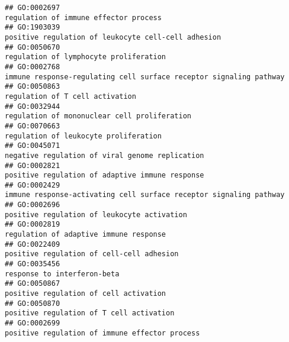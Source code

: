 \documentclass[
]{article}
\begin{document}
\begin{verbatim}
## GO:0002697                                                                                                            regulation of immune effector process
## GO:1903039                                                                                              positive regulation of leukocyte cell-cell adhesion
## GO:0050670                                                                                                           regulation of lymphocyte proliferation
## GO:0002768                                                                               immune response-regulating cell surface receptor signaling pathway
## GO:0050863                                                                                                                  regulation of T cell activation
## GO:0032944                                                                                                     regulation of mononuclear cell proliferation
## GO:0070663                                                                                                            regulation of leukocyte proliferation
## GO:0045071                                                                                                  negative regulation of viral genome replication
## GO:0002821                                                                                                  positive regulation of adaptive immune response
## GO:0002429                                                                               immune response-activating cell surface receptor signaling pathway
## GO:0002696                                                                                                      positive regulation of leukocyte activation
## GO:0002819                                                                                                           regulation of adaptive immune response
## GO:0022409                                                                                                        positive regulation of cell-cell adhesion
## GO:0035456                                                                                                                      response to interferon-beta
## GO:0050867                                                                                                           positive regulation of cell activation
## GO:0050870                                                                                                         positive regulation of T cell activation
## GO:0002699                                                                                                   positive regulation of immune effector process

\end{verbatim}
\end{document}
